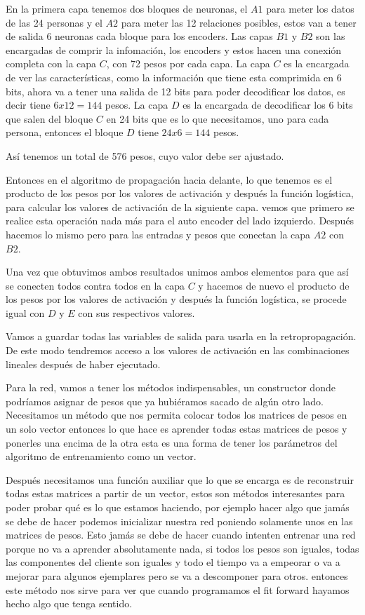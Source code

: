 {En la primera capa tenemos dos bloques de neuronas, el $A1$ para meter los datos de las 24 personas y el $A2$ para meter las 12 relaciones posibles, estos van a tener de salida 6 neuronas cada bloque para los encoders. Las capas $B1$ y $B2$ son las encargadas de comprir la infomación, los encoders y estos hacen una conexión completa con la capa $C$, con 72 pesos por cada capa. La capa $C$ es la encargada de ver las características, como la información que tiene esta comprimida en 6 bits, ahora va a tener una salida de 12 bits para poder decodificar los datos, es decir tiene $6x12=144$ pesos. 
La capa $D$ es la encargada de decodificar los 6 bits que salen del bloque $C$ en 24 bits que es lo que necesitamos, uno para cada persona, entonces el bloque $D$ tiene $24x6=144$ pesos.

Así tenemos un total de 576 pesos, cuyo valor debe ser ajustado.

Entonces en el algoritmo de propagación hacia delante, lo que tenemos es el producto de los pesos por los valores de activación y después la función logística, para calcular los valores de activación de la siguiente capa. vemos que primero se realice esta operación nada más para el auto encoder del lado izquierdo. Después hacemos lo mismo pero para las entradas y pesos que conectan la capa $A2$ con $B2$. 

Una vez que obtuvimos ambos resultados unimos ambos elementos para que así se conecten todos contra todos en la capa $C$ y hacemos de nuevo el producto de los pesos por los valores de activación y después la función logística, se procede igual con $D$ y $E$ con sus respectivos valores.

Vamos a guardar todas las variables de salida para usarla en la retropropagación. De este modo tendremos acceso a los valores de activación en las combinaciones lineales después de haber ejecutado. 

Para la red, vamos a tener los métodos indispensables, un constructor donde podríamos asignar de pesos que ya hubiéramos sacado de algún otro lado.
Necesitamos un método que nos permita colocar todos los matrices de pesos en un solo vector entonces lo que hace es aprender todas estas matrices de pesos y ponerles una encima de la otra esta es una forma de tener los parámetros del algoritmo de entrenamiento como un vector. 

Después necesitamos una función auxiliar que lo que se encarga es de reconstruir todas estas matrices a partir de un vector, estos son métodos interesantes para poder probar qué es lo que estamos haciendo, por ejemplo hacer algo que jamás se debe de hacer podemos inicializar nuestra  red poniendo solamente unos en las matrices de pesos. Esto jamás se debe de hacer cuando intenten entrenar una red porque no va a aprender absolutamente nada, si todos los pesos son iguales, todas las componentes del cliente son iguales y todo el tiempo va a empeorar o va a mejorar para algunos ejemplares pero se va a descomponer para otros. entonces este método nos sirve para ver que cuando programamos el fit forward hayamos hecho algo que tenga sentido.

}
